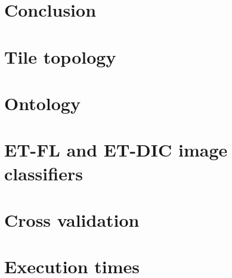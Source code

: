 \documentclass[a4paper,12pt]{report}
\begin{document}
	\chapter{Conclusion}
	
	
	\appendix
	
	\chapter{Tile topology}
	
	\newpage
	
	\chapter{Ontology}
	
	\newpage
	
	\chapter{ET-FL and ET-DIC image classifiers}
	
	\newpage
	
	\chapter{Cross validation}
	
	\newpage
	
	\chapter{Execution times}
	
	\newpage
	


	\listoftables
	
	\listoffigures
	
	\printbibliography[heading=bibintoc]
\end{document}
